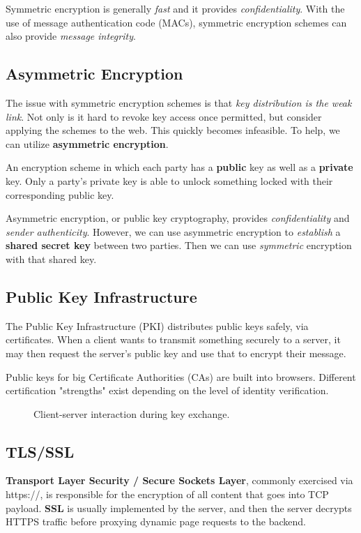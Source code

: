 Symmetric encryption is generally \emph{fast} and it provides \emph{confidentiality}. With the use of message authentication code (MACs), symmetric encryption schemes can also provide \emph{message integrity}.

\subsection{Asymmetric Encryption}
The issue with symmetric encryption schemes is that \emph{key distribution is the weak link}. Not only is it hard to revoke key access once permitted, but consider applying the schemes to the web. This quickly becomes infeasible. To help, we can utilize \textbf{asymmetric encryption}.

\begin{definition}
	An encryption scheme in which each party has a \textbf{public} key as well as a \textbf{private} key. Only a party's private key is able to unlock something locked with their corresponding public key.
\end{definition}

Asymmetric encryption, or public key cryptography, provides \emph{confidentiality} and \emph{sender authenticity}. However, we can use asymmetric encryption to \emph{establish} a \textbf{shared secret key} between two parties. Then we can use \emph{symmetric} encryption with that shared key.

\subsection{Public Key Infrastructure}
The Public Key Infrastructure (PKI) distributes public keys safely, via certificates. When a client wants to transmit something securely to a server, it may then request the server's public key and use that to encrypt their message. \par

Public keys for big Certificate Authorities (CAs) are built into browsers. Different certification "strengths" exist depending on the level of identity verification.

\begin{figure}[H]
	\centering
	\caption{Client-server interaction during key exchange.}
	\label{fig:asymsymkeyex}
\end{figure}

\subsection{TLS/SSL}
\textbf{Transport Layer Security / Secure Sockets Layer}, commonly exercised via https://, is responsible for the encryption of all content that goes into TCP payload. \textbf{SSL} is usually implemented by the server, and then the server decrypts HTTPS traffic before proxying dynamic page requests to the backend.

